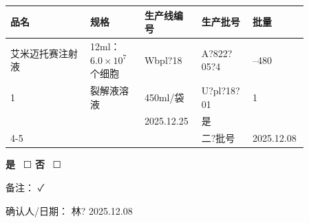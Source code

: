 \documentclass[UTF8,10pt,a4paper,fontset=fandol]{ctexart}
\newcommand{\fieldvalue}[1]{#1}
\newcommand{\handwritten}[1]{#1}
\newcommand{\checkboxfield}[1]{\ifstrequal{#1}{checked}{☑}{\ifstrequal{#1}{unclear}{?}{☐}}}
\begin{document}
\noindent
\begin{tabular}{|p{0.25\linewidth}|p{0.17\linewidth}|p{0.16\linewidth}|p{0.16\linewidth}|p{0.12\linewidth}|}
\hline
\centering 品名 & \centering 规格 & \centering 生产线编号 & \centering 生产批号 & \centering 批量\\
\hline
\centering \fieldvalue{艾米迈托赛注射液} &
\centering \fieldvalue{12ml：$6.0\times10^{7}$个细胞} &
\centering \fieldvalue{\handwritten{Wbpl?18}} &
\centering \fieldvalue{\handwritten{A?822?05?4}} &
\centering \fieldvalue{200--480}\\
\hline
1 &
\fieldvalue{裂解液溶液} &
\fieldvalue{450ml/袋} &
\fieldvalue{\handwritten{U?pl?18?01}} &
\fieldvalue{\handwritten{1}}\\
\hline
& & 
\fieldvalue{\handwritten{2025.12.25}} &
\fieldvalue{\handwritten{是}}\\
\cline{4-5}
& & &
\fieldvalue{\handwritten{二?批号}} &
\fieldvalue{\handwritten{2025.12.08}}\\
\hline
\end{tabular}

\noindent
\textbf{是}\ 
\fieldvalue{\checkboxfield{unchecked}}
\qquad
\textbf{否}\ 
\fieldvalue{\checkboxfield{unchecked}}

\medskip

\noindent
备注：
\fieldvalue{\handwritten{✓}}

\medskip

\noindent
确认人/日期：
\fieldvalue{\handwritten{林?}}
\qquad
\fieldvalue{\handwritten{2025.12.08}}
\end{document}
